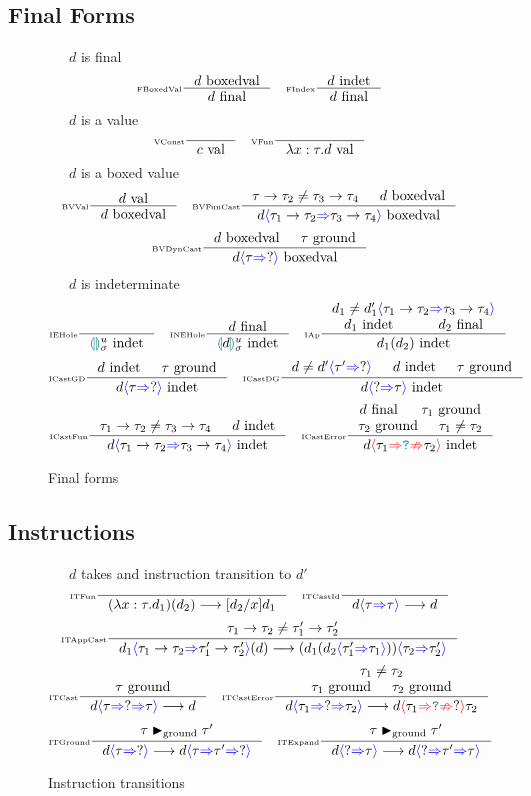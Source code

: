 \subsection{Final Forms}

\begin{figure}[H]
\small
\fbox{$\final$}\ \ \ $d$ is final
\tiny
\[\inference[\tiny FBoxedVal]{\boxedval}{\final}\quad
\inference[\tiny FIndex]{\indet}{\final}\]
\small
\fbox{$\val$}\ \ \ $d$ is a value
\tiny
\[\inference[\tiny VConst]{}{\val[c]}\quad
\inference[\tiny VFun]{}{\val[\lambda x:\tau. d]}\]
\small
\fbox{$\boxedval$}\ \ \ $d$ is a boxed value
\tiny
\[\inference[\tiny BVVal]{\val}{\boxedval}\quad
\inference[\tiny BVFunCast]{\tau \to \tau_2 \neq \tau_3 \to \tau_4 & \boxedval}{\boxedval[d\scast{\tau_1 \to \tau_2}{\tau_3 \to \tau_4}]}\]
\[\inference[\tiny BVDynCast]{\boxedval & \ground}{\boxedval[d\scast{\tau}{?}]}\]
\small
\fbox{$\indet$}\ \ \ $d$ is indeterminate
\tiny
\[\inference[\tiny IEHole]{}{\indet[\hole^u_\sigma]}\quad
\inference[\tiny INEHole]{\final}{\indet[{\hole[d]^u_\sigma}]}\quad
\inference[\tiny IAp]{d_1 \neq d_1'\scast{\tau_1 \to \tau_2}{\tau_3 \to \tau_4} \\ \indet[d_1] & \final[d_2]}{\indet[d_1(d_2)]}\]
\[\inference[\tiny ICastGD]{\indet & \ground}{\indet[d\scast{\tau}{?}]}\quad
\inference[\tiny ICastDG]{d \neq d'\scast{\tau'}{?} & \indet & \ground}{\indet[d\scast{?}{\tau}]}\]
\[\inference[\tiny ICastFun]{\tau_1 \to \tau_2 \neq \tau_3 \to \tau_4 & \indet}{\indet[d\scast{\tau_1 \to \tau_2}{\tau_3 \to \tau_4}]}\quad
\inference[\tiny ICastError]{\final & \ground[\tau_1] \\ \ground[\tau_2] & \tau_1 \neq \tau_2}{\indet[d\scasterror{\tau_1}{\tau_2}]}\]

\caption{Final forms}
\label{fig:finalforms}
\end{figure}

\subsection{Instructions}
\begin{figure}[H]
\small
{}\ \ \ $d$ takes and instruction transition to $d'$
\tiny
\[\inference[\tiny ITFun]{}{(\lambda x:\tau. d_1)(d_2) \longrightarrow [d_2/x]d_1}\quad
\inference[\tiny ITCastId]{}{d\scast{\tau}{\tau} \longrightarrow d}\]
\[\inference[\tiny ITAppCast]{\tau_1 \to \tau_2 \neq \tau_1' \to \tau_2'}{d_1\scast{\tau_1 \to \tau_2}{\tau_1' \to \tau_2'}(d) \longrightarrow (d_1(d_2\scast{\tau_1'}{\tau_1}))\scast{\tau_2}{\tau_2'}}\]
\[\inference[\tiny ITCast]{\ground}{d\scastcast{\tau}{?}{\tau} \longrightarrow d} \quad
\inference[\tiny ITCastError]{\tau_1 \neq \tau_2 \\ \ground[\tau_1] & \ground[\tau_2]}{d\scastcast{\tau_1}{?}{\tau_2}\longrightarrow d\scasterror{\tau_1}{?}{\tau_2}}\]
\[\inference[\tiny ITGround]{\tau \groundmatch \tau'}{d\scast{\tau}{?} \longrightarrow d\scastcast{\tau}{\tau'}{?}}\quad
\inference[\tiny ITExpand]{\tau \groundmatch \tau'}{d\scast{?}{\tau} \longrightarrow d\scastcast{?}{\tau'}{\tau}}\]
\caption{Instruction transitions}
\label{fig:instructions}
\end{figure}

